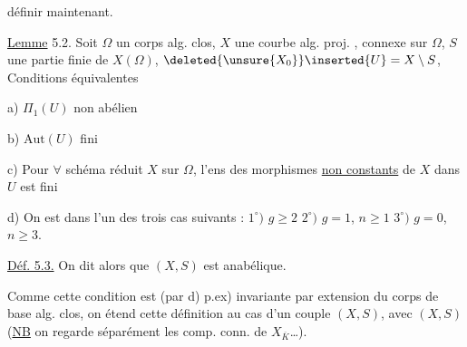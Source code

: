 

définir maintenant.

\uline{Lemme} 5.2. Soit $\Omega$ un corps alg. clos, $X$ une  courbe alg. proj. , connexe sur $\Omega$, $S$ une partie finie de $X(\Omega)$,  $\deleted{\unsure{X_0}}\inserted{U}=X\setminus S$, Conditions équivalentes

a) $\Pi_1(U)$ non abélien

b) $\mathrm{Aut}(U)$ fini

c) Pour $\forall$ schéma  réduit $X$  sur $\Omega$, l'ens des morphismes \uline{non constants} de $X$ dans $U$ est fini

d) On est  dans l'un des trois cas suivants : $1^\circ)$  $g\geq 2$ \quad $2^\circ)$ $g=1$, $n\geq 1$ \quad $3^\circ)$ $g=0$, $n\geq 3$.


\uline{Déf. 5.3.} On dit alors que $(X,S)$ est anabélique. 

Comme cette condition est (par d) p.ex) invariante par extension du corps de base alg. clos, on étend cette définition au cas d'un couple $(X,S)$, avec $(X,S)$   (\uline{NB} on regarde séparément les comp. conn. de $X_{\overline K}$\dots).

